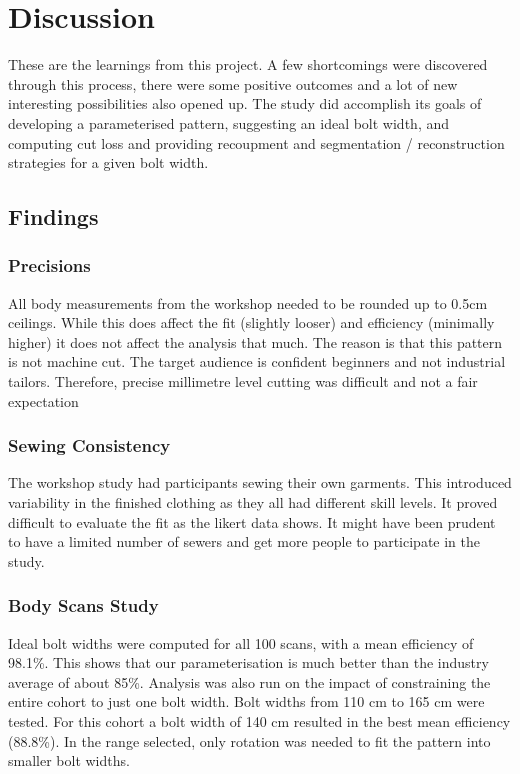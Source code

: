 \chapter{Discussion}
These are the learnings from this project. A few shortcomings were discovered through this process, there were some positive outcomes and a lot of new interesting possibilities also opened up. 
The study did accomplish its goals of developing a parameterised pattern, suggesting an ideal bolt width, and computing cut loss and providing recoupment and segmentation / reconstruction strategies for a given bolt width.

\section{Findings}
\subsection{Precisions}
All body measurements from the workshop needed to be rounded up to 0.5cm ceilings. While this does affect the fit (slightly looser) and efficiency (minimally higher) it does not affect the analysis that much. The reason is that this pattern is not machine cut. The target audience is confident beginners and not industrial tailors. Therefore, precise millimetre level cutting was difficult and not a fair expectation

\subsection{Sewing Consistency}
The workshop study had participants sewing their own garments. This introduced variability in the finished clothing as they all had different skill levels. It proved difficult to evaluate the fit as the likert data shows. It might have been prudent to have a limited number of sewers and get more people to participate in the study.

\subsection{Body Scans Study}
Ideal bolt widths were computed for all 100 scans, with a mean efficiency of 98.1\%. This shows that our parameterisation is much better than the industry average of about 85\%. 
Analysis was also run on the impact of constraining the entire cohort to just one bolt width. Bolt widths from 110 cm to 165 cm were tested. For this cohort a bolt width of 140 cm resulted in the best mean efficiency (88.8\%). In the range selected, only rotation was needed to fit the pattern into smaller bolt widths.


